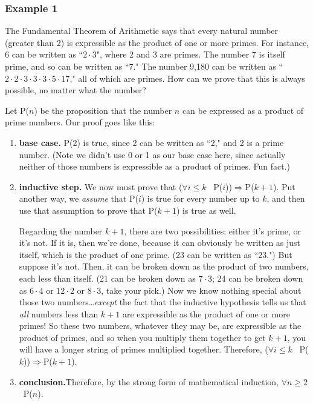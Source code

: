 \subsubsection{Example 1}

The Fundamental Theorem of Arithmetic says that every natural number
(greater than 2) is expressible as the product of one or more primes.  For
instance, 6 can be written as ``$2 \cdot 3$", where 2 and 3 are primes. The
number 7 is itself prime, and so can be written as ``$7$." The number 9,180
can be written as ``$2 \cdot 2 \cdot 3 \cdot 3 \cdot 3 \cdot 5 \cdot 17$," all of
which are primes. How can we prove that this is always possible, no matter
what the number?

Let P($n$) be the proposition that the number $n$ can be expressed as a
product of prime numbers. Our proof goes like this:

\begin{enumerate} 

\item \textbf{base case.} P(2) is true, since 2 can be written as ``2," and
2 is a prime number. (Note we didn't use 0 or 1 as our base case here,
since actually neither of those numbers is expressible as a product of
primes. Fun fact.)

\item \textbf{inductive step.}
We now must prove that ($\forall i \leq k$ \ P($i$))$\Rightarrow$P($k+1$).
Put another way, we \textit{assume} that P($i$) is true for every number up
to $k$, and then use that assumption to prove that P($k+1$) is true as
well.

Regarding the number $k+1$, there are two possibilities: either it's prime,
or it's not. If it is, then we're done, because it can obviously be written
as just itself, which is the product of one prime. (23 can be written as
``23.") But suppose it's not.
Then, it can be broken down as the product of two numbers, each less than
itself. (21 can be broken down as $7 \cdot 3$; 24 can be broken down as $6
\cdot 4$ or $12 \cdot 2$ or $8 \cdot 3$, take your pick.) Now we know nothing
special about those two numbers\dots \textit{except} the fact that the
inductive hypothesis tells us that \textit{all} numbers less than $k+1$ are
expressible as the product of one or more primes! So these two numbers,
whatever they may be, are expressible as the product of primes, and so when
you multiply them together to get $k+1$, you will have a longer string of
primes multiplied together. Therefore, ($\forall i \leq k$ \
P($k$))$\Rightarrow$P($k+1$).

\item \textbf{conclusion.}Therefore, by the strong form of mathematical induction, $\forall n \geq 2$
  \ P($n$).
\end{enumerate}

